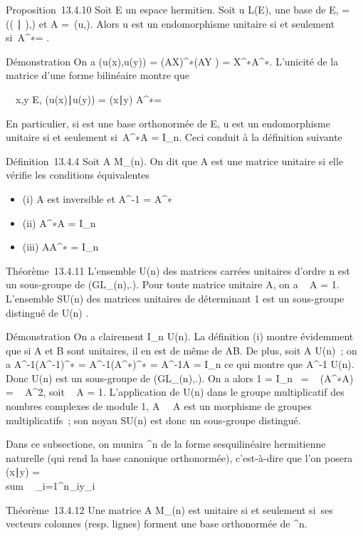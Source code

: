 \documentclass[]{article}
\begin{document}
Proposition~13.4.10 Soit E un espace hermitien. Soit u \in L(E),  une
base de E, \Omega = \mathrmMat~
(( ∣ ),) et A =\
\mathrmMat (u,). Alors u est un endomorphisme
unitaire si et seulement si~A^∗\OmegaA = \Omega.

Démonstration On a \phi(u(x),u(y)) = (AX)^∗\Omega(AY ) =
X^∗A^∗\OmegaAY . L'unicité de la matrice d'une forme
bilinéaire montre que

\forall~~x,y \in E,
(u(x)∣u(y)) =
(x∣y) \mathrel\Leftrightarrow
A^∗\OmegaA = \Omega

En particulier, si  est une base orthonormée de E, u est un
endomorphisme unitaire si et seulement si~A^∗A =
I_n. Ceci conduit à la définition suivante

Définition~13.4.4 Soit A \in M_(n). On dit que A est une matrice
unitaire si elle vérifie les conditions équivalentes

\begin{itemize}
\itemsep1pt\parskip0pt
\item
  (i) A est inversible et A^-1 = A^∗
\item
  (ii) A^∗A = I_n
\item
  (iii) AA^∗ = I_n
\end{itemize}

Théorème~13.4.11 L'ensemble U(n) des matrices carrées unitaires d'ordre
n est un sous-groupe de (GL_\mathbb{C}(n),.). Pour toute matrice
unitaire A, on a
~
A = 1. L'ensemble SU(n) des matrices unitaires de déterminant
1 est un sous-groupe distingué de U(n) .

Démonstration On a clairement I_n \in U(n). La définition (i)
montre évidemment que si A et B sont unitaires, il en est de même de AB.
De plus, soit A \in U(n)~; on a
A^-1(A^-1)^∗ =
A^-1(A^∗)^∗ = A^-1A =
I_n ce qui montre que A^-1 \in U(n). Donc U(n) est un
sous-groupe de (GL_(n),.). On a alors 1
=  I_n~
= ~
(A^∗A) =
~
A^2, soit
\mathrm{det}~
A = 1. L'application de U(n) dans le groupe multiplicatif des
nombres complexes de module 1,
A\mapsto~~
A est un morphisme de groupes multiplicatifs~; son noyau SU(n) est donc
un sous-groupe distingué.

Dans ce subsectione, on munira ^n de la forme sesquilinéaire
hermitienne naturelle (qui rend la base canonique orthonormée),
c'est-à-dire que l'on posera (x∣y)
= \\sum ~
_i=1^n\overlinex_iy_i

Théorème~13.4.12 Une matrice A \in M_(n) est unitaire si et
seulement si~ses vecteurs colonnes (resp. lignes) forment une base
orthonormée de \mathbb{C}^n.
\end{document}
